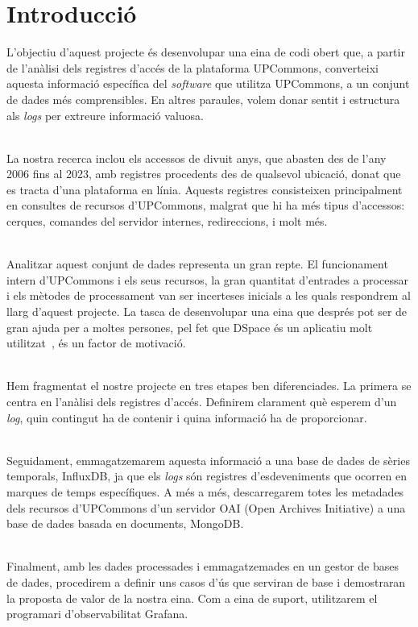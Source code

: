\chapter*{Introducció}\label{ch:introduction}

L'objectiu d'aquest projecte és desenvolupar una eina de codi obert que, a partir de l'anàlisi dels registres d'accés de la plataforma \gls{UPCommons}, converteixi aquesta informació específica del \textit{software} que utilitza \gls{UPCommons}, a un conjunt de dades més comprensibles.
En altres paraules, volem donar sentit i estructura als \textit{\gls{log}s} per extreure informació valuosa.

\noindent \\
La nostra recerca inclou els accessos de divuit anys, que abasten des de l'any 2006 fins al 2023, amb registres procedents des de qualsevol ubicació, donat que es tracta d'una plataforma en línia.
Aquests registres consisteixen principalment en consultes de recursos d'\gls{UPCommons}, malgrat que hi ha més tipus d'accessos: cerques, comandes del servidor internes, redireccions, i molt més.

\noindent \\
Analitzar aquest conjunt de dades representa un gran repte.
El funcionament intern d'\gls{UPCommons} i els seus recursos, la gran quantitat d'entrades a processar i els mètodes de processament van ser incerteses inicials a les quals respondrem al llarg d'aquest projecte.
La tasca de desenvolupar una eina que després pot ser de gran ajuda per a moltes persones, pel fet que \gls{DSpace} és un aplicatiu molt utilitzat~\cite{eprints:roar}, és un factor de motivació.

\noindent \\
Hem fragmentat el nostre projecte en tres etapes ben diferenciades.
La primera se centra en l'anàlisi dels registres d'accés.
Definirem clarament què esperem d'un \textit{\gls{log}}, quin contingut ha de contenir i quina informació ha de proporcionar.

\noindent \\
Seguidament, emmagatzemarem aquesta informació a una base de dades de sèries temporals, InfluxDB, ja que els \textit{\gls{log}s} són registres d'esdeveniments que ocorren en marques de temps específiques.
A més a més, descarregarem totes les metadades dels recursos d'\gls{UPCommons} d'un servidor OAI (Open Archives Initiative) a una base de dades basada en documents, MongoDB.

\noindent \\
Finalment, amb les dades processades i emmagatzemades en un gestor de bases de dades, procedirem a definir uns casos d'ús que serviran de base i demostraran la proposta de valor de la nostra eina.
Com a eina de suport, utilitzarem el programari d'observabilitat Grafana.

